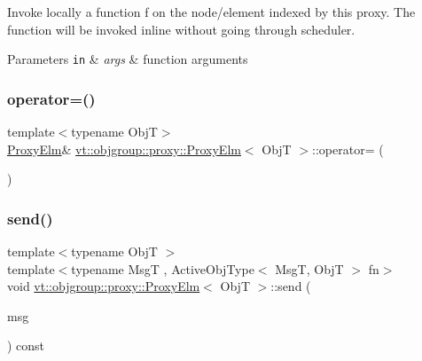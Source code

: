 Invoke locally a function \textquotesingle{}f\textquotesingle{} on the node/element indexed by this proxy. The function will be invoked inline without going through scheduler. 


\begin{DoxyParams}[1]{Parameters}
\mbox{\tt in}  & {\em args} & function arguments \\
\hline
\end{DoxyParams}
\mbox{\label{structvt_1_1objgroup_1_1proxy_1_1_proxy_elm_a9211613f646a4f3d215cf1d9e76219db}} 
\subsubsection{\texorpdfstring{operator=()}{operator=()}}
{\footnotesize\ttfamily template$<$typename ObjT$>$ \\
\hyperlink{structvt_1_1objgroup_1_1proxy_1_1_proxy_elm}{Proxy\+Elm}\& \hyperlink{structvt_1_1objgroup_1_1proxy_1_1_proxy_elm}{vt\+::objgroup\+::proxy\+::\+Proxy\+Elm}$<$ ObjT $>$\+::operator= (\begin{DoxyParamCaption}\item[{\hyperlink{structvt_1_1objgroup_1_1proxy_1_1_proxy_elm}{Proxy\+Elm}$<$ ObjT $>$ const \&}]{ }\end{DoxyParamCaption})\hspace{0.3cm}{\ttfamily [default]}}

\mbox{\label{structvt_1_1objgroup_1_1proxy_1_1_proxy_elm_a64d85f6d2721f2001e1e9ecb910e34f9}} 
\subsubsection{\texorpdfstring{send()}{send()}\hspace{0.1cm}{\footnotesize\ttfamily [1/3]}}
{\footnotesize\ttfamily template$<$typename ObjT $>$ \\
template$<$typename MsgT , Active\+Obj\+Type$<$ Msg\+T, Obj\+T $>$ fn$>$ \\
void \hyperlink{structvt_1_1objgroup_1_1proxy_1_1_proxy_elm}{vt\+::objgroup\+::proxy\+::\+Proxy\+Elm}$<$ ObjT $>$\+::send (\begin{DoxyParamCaption}\item[{MsgT $\ast$}]{msg }\end{DoxyParamCaption}) const}



